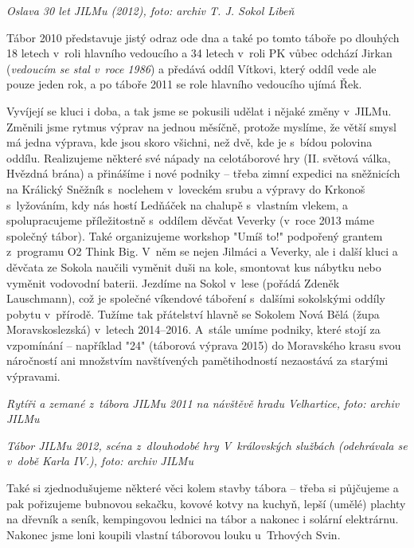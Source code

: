 \documentclass[a5paper, 12pt, twoside]{article}
\begin{document}
\textit{Oslava 30 let JILMu (2012), foto: archiv T. J. Sokol Libeň}

Tábor 2010 představuje jistý odraz ode dna a také po tomto táboře po
dlouhých 18 letech v~roli hlavního vedoucího a 34 letech v~roli PK vůbec
odchází Jirkan (\textit{vedoucím se stal v~roce 1986}) a předává oddíl
Vítkovi, který oddíl vede ale pouze jeden rok, a po táboře 2011 se role
hlavního vedoucího ujímá Řek.

Vyvíjejí se kluci i doba, a tak jsme se pokusili udělat i nějaké změny
v~JILMu. Změnili jsme rytmus výprav na jednou měsíčně, protože myslíme, že
větší smysl má jedna výprava, kde jsou skoro všichni, než dvě, kde je
s~bídou polovina oddílu. Realizujeme některé své nápady na celotáborové
hry (II. světová válka, Hvězdná brána) a přinášíme i nové podniky --
třeba zimní expedici na sněžnicích na Králický Sněžník s~noclehem
v~loveckém srubu a výpravy do Krkonoš s~lyžováním, kdy nás hostí Ledňáček
na chalupě s~vlastním vlekem, a spolupracujeme příležitostně s~oddílem
děvčat Veverky (v~roce 2013 máme společný tábor). Také organizujeme
workshop "Umíš to!" podpořený grantem z~programu O2 Think Big. V~něm
se nejen Jilmáci a Veverky, ale i další kluci a děvčata ze Sokola
naučili vyměnit duši na kole, smontovat kus nábytku nebo vyměnit
vodovodní baterii. Jezdíme na Sokol v~lese (pořádá Zdeněk Lauschmann),
což je společné víkendové táboření s~dalšími sokolskými oddíly pobytu
v~přírodě. Tužíme tak přátelství hlavně se Sokolem Nová Bělá (župa
Moravskoslezská) v~letech 2014--2016. A~stále umíme podniky, které stojí
za vzpomínání -- například "24" (táborová výprava 2015) do Moravského
krasu svou náročností ani množstvím navštívených pamětihodností
nezaostává za starými výpravami.


\textit{Rytíři a zemané z~tábora JILMu 2011 na návštěvě hradu Velhartice,
foto: archiv JILMu}


\textit{Tábor JILMu 2012, scéna z~dlouhodobé hry V~královských službách
(odehrávala se v~době Karla IV.), foto: archiv JILMu}

Také si zjednodušujeme některé věci kolem stavby tábora -- třeba si
půjčujeme a pak pořizujeme bubnovou sekačku, kovové kotvy na kuchyň,
lepší (umělé) plachty na dřevník a seník, kempingovou lednici na tábor a
nakonec i solární elektrárnu. Nakonec jsme loni koupili vlastní
táborovou louku u~Trhových Svin.
\end{document}
